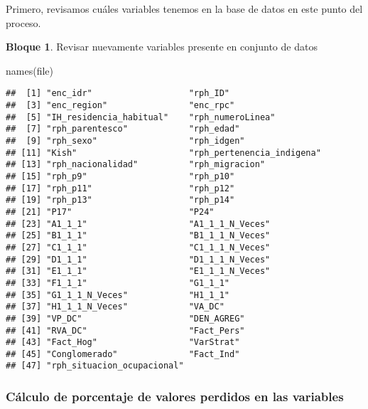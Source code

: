 \documentclass[
]{book}
\newenvironment{Shaded}{\begin{snugshade}}{\end{snugshade}}
\newcommand{\FunctionTok}[1]{\textcolor[rgb]{0.00,0.00,0.00}{#1}}
\newcommand{\NormalTok}[1]{#1}
\theoremstyle{definition}
\theoremstyle{definition}
\newtheorem{example}{Bloque}[chapter]
\theoremstyle{definition}
\theoremstyle{definition}
\theoremstyle{remark}
\begin{document}
Primero, revisamos cuáles variables tenemos en la base de datos en este punto del proceso.

\begin{example}
\protect\hypertarget{exm:bloque34nbm}{}\label{exm:bloque34nbm}Revisar nuevamente variables presente en conjunto de datos
\end{example}

\begin{Shaded}
\begin{Highlighting}[]
\FunctionTok{names}\NormalTok{(file)}
\end{Highlighting}
\end{Shaded}

\begin{verbatim}
##  [1] "enc_idr"                   "rph_ID"                   
##  [3] "enc_region"                "enc_rpc"                  
##  [5] "IH_residencia_habitual"    "rph_numeroLinea"          
##  [7] "rph_parentesco"            "rph_edad"                 
##  [9] "rph_sexo"                  "rph_idgen"                
## [11] "Kish"                      "rph_pertenencia_indigena" 
## [13] "rph_nacionalidad"          "rph_migracion"            
## [15] "rph_p9"                    "rph_p10"                  
## [17] "rph_p11"                   "rph_p12"                  
## [19] "rph_p13"                   "rph_p14"                  
## [21] "P17"                       "P24"                      
## [23] "A1_1_1"                    "A1_1_1_N_Veces"           
## [25] "B1_1_1"                    "B1_1_1_N_Veces"           
## [27] "C1_1_1"                    "C1_1_1_N_Veces"           
## [29] "D1_1_1"                    "D1_1_1_N_Veces"           
## [31] "E1_1_1"                    "E1_1_1_N_Veces"           
## [33] "F1_1_1"                    "G1_1_1"                   
## [35] "G1_1_1_N_Veces"            "H1_1_1"                   
## [37] "H1_1_1_N_Veces"            "VA_DC"                    
## [39] "VP_DC"                     "DEN_AGREG"                
## [41] "RVA_DC"                    "Fact_Pers"                
## [43] "Fact_Hog"                  "VarStrat"                 
## [45] "Conglomerado"              "Fact_Ind"                 
## [47] "rph_situacion_ocupacional"
\end{verbatim}

\hypertarget{cuxe1lculo-de-porcentaje-de-valores-perdidos-en-las-variables}{%
\subsubsection{Cálculo de porcentaje de valores perdidos en las variables}\label{cuxe1lculo-de-porcentaje-de-valores-perdidos-en-las-variables}}
\end{document}
